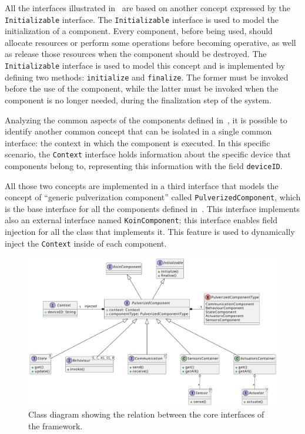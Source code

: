 All the interfaces illustrated in~ are based on another concept expressed by the \texttt{Initializable} interface.
The \texttt{Initializable} interface is used to model the initialization of a component. Every component, before being used, should allocate resources
or perform some operations before becoming operative, as well as release those resources when the component should be destroyed.
The \texttt{Initializable} interface is used to model this concept and is implemented by defining two methods: \texttt{initialize} and
\texttt{finalize}. The former must be invoked before the use of the component, while the latter must be invoked when the component is no longer
needed, during the finalization step of the system.

Analyzing the common aspects of the components defined in~, it is possible to identify another common concept that can
be isolated in a single common interface: the context in which the component is executed. In this specific scenario, the \texttt{Context} interface
holds information about the specific device that components belong to, representing this information with the field \texttt{deviceID}.

All those two concepts are implemented in a third interface that models the concept of ``generic pulverization component'' called
\texttt{PulverizedComponent}, which is the base interface for all the components defined in~.
This interface implements also an external interface named \texttt{KoinComponent}; this interface enables field injection for all the class that
implements it. This feature is used to dynamically inject the \texttt{Context} inside of each component.

\begin{figure}
	\centering
	\includegraphics[width=\textwidth]{figures/core-impl-interfaces.pdf}
	\caption{Class diagram showing the relation between the core interfaces of the framework.}
	\label{fig:core-interfaces-class-diagram}
\end{figure}

